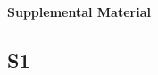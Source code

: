 \documentclass[nonblindrev]{informs3}
\begin{document}










\clearpage
\begin{center}
\textbf{Supplemental Material}
\end{center}
\setcounter{section}{0}
\setcounter{equation}{0}
\setcounter{figure}{0}
\setcounter{table}{0}
\setcounter{page}{1}
\makeatletter
\renewcommand{\theequation}{S\arabic{equation}}
\renewcommand{\thefigure}{S\arabic{figure}}
\renewcommand{\thetable}{S\arabic{table}}
\renewcommand{\bibnumfmt}[1]{[S#1]}
\renewcommand{\citenumfont}[1]{S#1}
\renewcommand{\thesection}{S\arabic{section}}
\renewcommand{\thesubsection}{S.\arabic{subsection}}


\subsection{S1} \label{SEC: S1}

 
\end{document}
